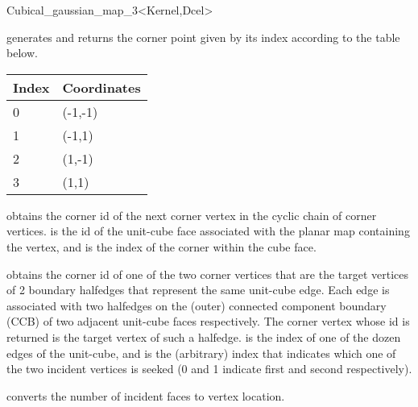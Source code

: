 \begin{ccRefClass}{Cubical_gaussian_map_3<Kernel,Dcel>}
{generates and returns the corner point given by its index according to the
  table below.\\
  \begin{tabular}{l|l}
    Index & Coordinates\\
    \hline
    0 & (-1,-1)\\
    1 & (-1,1)\\
    2 & (1,-1)\\
    3 & (1,1)
  \end{tabular}
}

{obtains the corner id of the next corner vertex in the cyclic chain of corner
  vertices.  is the id of the unit-cube face associated with the
  planar map containing the vertex, and  is the index of the
  corner within the cube face.
}

{obtains the corner id of one of the two corner vertices that are the target
  vertices of 2 boundary halfedges that represent the same unit-cube edge.
  Each edge is associated with two halfedges on the (outer) connected
  component boundary (CCB) of two adjacent unit-cube faces respectively.
  The corner vertex whose id is returned is the target vertex of such a
  halfedge.
   is the index of one of the dozen edges of the unit-cube, and
   is the (arbitrary) index that indicates which one of the two
  incident vertices is seeked (0 and 1 indicate first and second respectively).
}

\ccOperations

{converts the number of incident faces to vertex location.
}

\ccSeeAlso
     \\

\end{ccRefClass}
